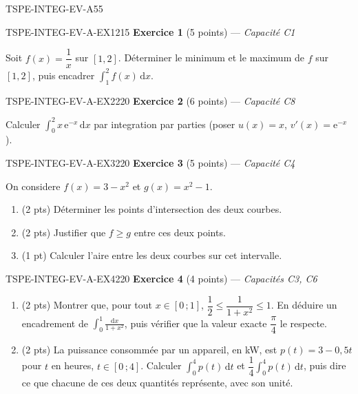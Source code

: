 \begin{evaluation}{TSPE-INTEG-EV-A}{55}

\begin{exercice}{TSPE-INTEG-EV-A-EX1}{2}{15}
\textbf{Exercice 1} (5 points) — \textit{Capacité C1}

\medskip

Soit $f(x)=\dfrac{1}{x}$ sur $[1,2]$. Déterminer le minimum et le maximum de $f$ sur $[1,2]$, puis encadrer $\displaystyle\int_1^2 f(x)\,\mathrm{d}x$.
\end{exercice}

\begin{exercice}{TSPE-INTEG-EV-A-EX2}{2}{20}
\textbf{Exercice 2} (6 points) — \textit{Capacité C8}

\medskip

Calculer $\displaystyle\int_0^2 x\,\mathrm{e}^{-x}\,\mathrm{d}x$ par integration par parties (poser $u(x)=x$, $v'(x)=\mathrm{e}^{-x}$).
\end{exercice}

\begin{exercice}{TSPE-INTEG-EV-A-EX3}{2}{20}
\textbf{Exercice 3} (5 points) — \textit{Capacité C4}

\medskip

On considere $f(x)=3-x^2$ et $g(x)=x^2-1$.
\begin{enumerate}
  \item (2 pts) Déterminer les points d'intersection des deux courbes.
  \item (2 pts) Justifier que $f \geq g$ entre ces deux points.
  \item (1 pt) Calculer l'aire entre les deux courbes sur cet intervalle.
\end{enumerate}
\end{exercice}

\begin{exercice}{TSPE-INTEG-EV-A-EX4}{2}{20}
\textbf{Exercice 4} (4 points) — \textit{Capacités C3, C6}

\medskip

\begin{enumerate}
  \item (2 pts) Montrer que, pour tout $x\in[0\,;1]$, $\dfrac12\leq\dfrac{1}{1+x^2}\leq1$. En déduire un encadrement de $\displaystyle\int_0^1\frac{\mathrm{d}x}{1+x^2}$, puis vérifier que la valeur exacte $\dfrac{\pi}{4}$ le respecte.
  \item (2 pts) La puissance consommée par un appareil, en kW, est $p(t)=3-0{,}5t$ pour $t$ en heures, $t\in[0\,;4]$. Calculer $\displaystyle\int_0^4 p(t)\,\mathrm{d}t$ et $\dfrac14\displaystyle\int_0^4 p(t)\,\mathrm{d}t$, puis dire ce que chacune de ces deux quantités représente, avec son unité.
\end{enumerate}
\end{exercice}

\end{evaluation}
